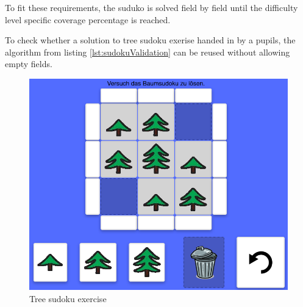 To fit these requirements, the suduko is solved field by field until the difficulty level specific coverage percentage is reached.

To check whether a solution to tree sudoku exerise handed in by a pupils, the algorithm from listing \ref{lst:sudokuValidation} can be reused without allowing empty fields.

\begin{figure} 
    \centering
    \includegraphics[width=0.6 \columnwidth]{figures/tree_sudoku_example_exercise.png}
    \caption{Tree sudoku exercise} 
    \label{fig:tree_sudoku_example_exercise} 
\end{figure}
